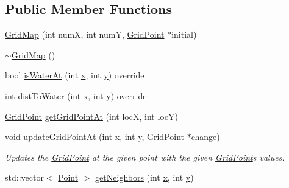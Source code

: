 \subsection*{Public Member Functions}
\begin{DoxyCompactItemize}
\item 
\mbox{\hyperlink{class_world_architect_1_1_grid_map_a2641cc9e0438e74c3f43cf85a92d6d55}{Grid\+Map}} (int numX, int numY, \mbox{\hyperlink{struct_world_architect_1_1_grid_point}{Grid\+Point}} $\ast$initial)
\item 
\mbox{\hyperlink{class_world_architect_1_1_grid_map_a53cc0906130bae883f5d544480039118}{$\sim$\+Grid\+Map}} ()
\item 
bool \mbox{\hyperlink{class_world_architect_1_1_grid_map_ae4562a4b2e6db010954854d64d1c5103}{is\+Water\+At}} (int \mbox{\hyperlink{class_world_architect_1_1_map_a1b4cf9200dca11577b4567584a1e62b8}{x}}, int \mbox{\hyperlink{class_world_architect_1_1_map_abd1e160bb8b03587caac4fb508c13307}{y}}) override
\item 
int \mbox{\hyperlink{class_world_architect_1_1_grid_map_ace26eee126a54bab32beee43a8adb560}{dist\+To\+Water}} (int \mbox{\hyperlink{class_world_architect_1_1_map_a1b4cf9200dca11577b4567584a1e62b8}{x}}, int \mbox{\hyperlink{class_world_architect_1_1_map_abd1e160bb8b03587caac4fb508c13307}{y}}) override
\item 
\mbox{\hyperlink{struct_world_architect_1_1_grid_point}{Grid\+Point}} \mbox{\hyperlink{class_world_architect_1_1_grid_map_a2f2f33edd0ff4eef14cfc14d6fb02337}{get\+Grid\+Point\+At}} (int locX, int locY)
\item 
void \mbox{\hyperlink{class_world_architect_1_1_grid_map_a67735350af692d4e42fe83e21c0cbe04}{update\+Grid\+Point\+At}} (int \mbox{\hyperlink{class_world_architect_1_1_map_a1b4cf9200dca11577b4567584a1e62b8}{x}}, int \mbox{\hyperlink{class_world_architect_1_1_map_abd1e160bb8b03587caac4fb508c13307}{y}}, \mbox{\hyperlink{struct_world_architect_1_1_grid_point}{Grid\+Point}} $\ast$change)
\begin{DoxyCompactList}\small\item\em Updates the \mbox{\hyperlink{struct_world_architect_1_1_grid_point}{Grid\+Point}} at the given point with the given \mbox{\hyperlink{struct_world_architect_1_1_grid_point}{Grid\+Point}}\textquotesingle{}s values. \end{DoxyCompactList}\item 
std\+::vector$<$ \mbox{\hyperlink{vector_8h_ac82aba4f8f70541442a30f1598bd0649}{Point}} $>$ \mbox{\hyperlink{class_world_architect_1_1_grid_map_a353fd3d5ac4bbfe84450814e0e5336bf}{get\+Neighbors}} (int \mbox{\hyperlink{class_world_architect_1_1_map_a1b4cf9200dca11577b4567584a1e62b8}{x}}, int \mbox{\hyperlink{class_world_architect_1_1_map_abd1e160bb8b03587caac4fb508c13307}{y}})

\end{DoxyCompactItemize}
